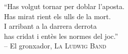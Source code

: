 
\newpage
\vspace*{2cm}

\begin{center}
    ``Has volgut tornar per doblar l'aposta. \\
    Has mirat rient els ulls de la mort. \\
    I arribant a la darrera derrota \\
    has cridat i entès les normes del joc.'' \\
    \vspace{0.3cm}
    -- El gronxador, \textsc{La Ludwig Band}
\end{center}

